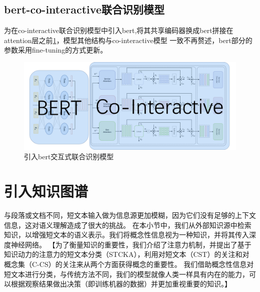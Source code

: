 \subsection{bert-co-interactive联合识别模型}

为在co-interactive联合识别模型中引入bert,将其共享编码器换成bert拼接在attention层之前\ref{fig:bert-joint}，模型其他结构与co-interactive模型
一致不再赘述，bert部分的参数采用fine-tuning的方式更新。
\begin{figure}[htbp]
  \centering
  \includegraphics[width=16cm]{./images/bert-joint.jpg}
  \caption{引入bert交互式联合识别模型}
  \label{fig:bert-joint}
\end{figure}


\section{引入知识图谱}
与段落或文档不同，短文本输入做为信息源更加模糊，因为它们没有足够的上下文信息，这对语义理解造成了很大的挑战。
在本小节中，我们从外部知识源中检索知识，以增强短文本的语义表示。我们将概念性信息视为一种知识，并将其传入深度神经网络。
【为了衡量知识的重要性，我们介绍了注意力机制，并提出了基于知识动力的注意力的短文本分类（STCKA），利用对短文本（CST）的关注和对概念集（C-CS）的关注来从两个方面获得概念的重要性。
我们借助概念性信息对短文本进行分类，与传统方法不同，我们的模型就像人类一样具有内在的能力，可以根据观察结果做出决策（即训练机器的数据）并更加重视重要的知识。】


